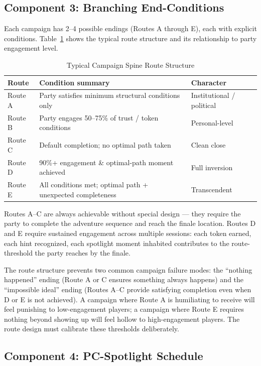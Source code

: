 \subsection{Component 3: Branching End-Conditions}

Each campaign has 2--4 possible endings (Routes A through E), each with explicit
conditions. Table~\ref{tab:routes} shows the typical route structure and its
relationship to party engagement level.

\begin{table}[t]
\caption{Typical Campaign Spine Route Structure}
\label{tab:routes}
\begin{tabular}{@{}lp{4.6cm}p{2.2cm}@{}}
\toprule
Route & Condition summary & Character \\
\midrule
Route A & Party satisfies minimum structural conditions only & Institutional / political \\
Route B & Party engages 50--75\% of trust / token conditions & Personal-level \\
Route C & Default completion; no optimal path taken & Clean close \\
Route D & 90\%+ engagement \& optimal-path moment achieved & Full inversion \\
Route E & All conditions met; optimal path + unexpected completeness & Transcendent \\
\bottomrule
\end{tabular}
\end{table}

Routes A--C are always achievable without special design --- they require the
party to complete the adventure sequence and reach the finale location. Routes D
and E require sustained engagement across multiple sessions: each token earned,
each hint recognized, each spotlight moment inhabited contributes to the
route-threshold the party reaches by the finale.

The route structure prevents two common campaign failure modes: the ``nothing
happened'' ending (Route A or C ensures something always happens) and the
``impossible ideal'' ending (Routes A--C provide satisfying completion even
when D or E is not achieved). A campaign where Route A is humiliating to receive
will feel punishing to low-engagement players; a campaign where Route E requires
nothing beyond showing up will feel hollow to high-engagement players. The
route design must calibrate these thresholds deliberately.

\subsection{Component 4: PC-Spotlight Schedule}

